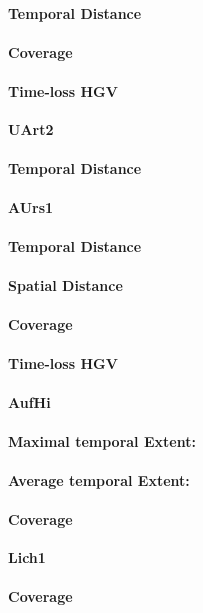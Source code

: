 \paragraph{Temporal Distance}
\paragraph{Coverage}
\paragraph{Time-loss HGV}

\large
\centerline{\textbf{UArt2}}
\normalsize

\paragraph{Temporal Distance}

\large
\centerline{\textbf{AUrs1}}
\normalsize

\paragraph{Temporal Distance}
\paragraph{Spatial Distance}
\paragraph{Coverage}
\paragraph{Time-loss HGV}

\large
\centerline{\textbf{AufHi}}
\normalsize

\paragraph{Maximal temporal Extent:}
\paragraph{Average temporal Extent:}
\paragraph{Coverage}

\large
\centerline{\textbf{Lich1}}
\normalsize

\paragraph{Coverage}

